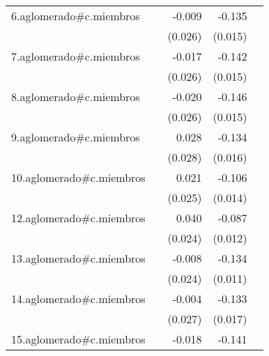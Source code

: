{\begin{longtable}{l*{4}{D{.}{.}{-1}}}
\addlinespace
6.aglomerado#c.miembros&                     &      -0.009         &      -0.135\sym{***}&                     \\
            &                     &     (0.026)         &     (0.015)         &                     \\
\addlinespace
7.aglomerado#c.miembros&                     &      -0.017         &      -0.142\sym{***}&                     \\
            &                     &     (0.026)         &     (0.015)         &                     \\
\addlinespace
8.aglomerado#c.miembros&                     &      -0.020         &      -0.146\sym{***}&                     \\
            &                     &     (0.026)         &     (0.015)         &                     \\
\addlinespace
9.aglomerado#c.miembros&                     &       0.028         &      -0.134\sym{***}&                     \\
            &                     &     (0.028)         &     (0.016)         &                     \\
\addlinespace
10.aglomerado#c.miembros&                     &       0.021         &      -0.106\sym{***}&                     \\
            &                     &     (0.025)         &     (0.014)         &                     \\
\addlinespace
12.aglomerado#c.miembros&                     &       0.040         &      -0.087\sym{***}&                     \\
            &                     &     (0.024)         &     (0.012)         &                     \\
\addlinespace
13.aglomerado#c.miembros&                     &      -0.008         &      -0.134\sym{***}&                     \\
            &                     &     (0.024)         &     (0.011)         &                     \\
\addlinespace
14.aglomerado#c.miembros&                     &      -0.004         &      -0.133\sym{***}&                     \\
            &                     &     (0.027)         &     (0.017)         &                     \\
\addlinespace
15.aglomerado#c.miembros&                     &      -0.018         &      -0.141\sym{***}&                     \\

\end{longtable}}
